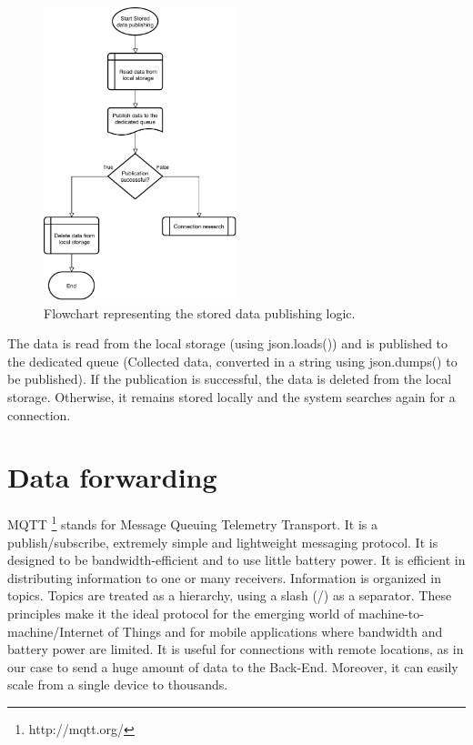 \begin{figure}[h]
\centering 
\includegraphics[width=0.5\textwidth]{images/flowstorage} 
\caption{Flowchart representing the stored data publishing logic.}
\label{fig:flowstorage}
\end{figure}

The data is read from the local storage (using json.loads()) and is published to the dedicated queue (Collected data, converted in a string using json.dumps() to be published). 
If the publication is successful, the data is deleted from the local storage. Otherwise, it remains stored locally and the system searches again for a connection.


\section{Data forwarding}
\label{sec:forward}
\vspace{0.2 cm} 

MQTT \footnote{http://mqtt.org/} stands for Message Queuing Telemetry Transport. It is a publish/subscribe, extremely simple and lightweight messaging protocol. It is designed to be bandwidth-efficient and to use little battery power. It is efficient in distributing information to one or many receivers. Information is organized in topics. Topics are treated as a hierarchy, using a slash (/) as a separator. These principles make it the ideal protocol for the emerging world of machine-to-machine/Internet of Things and for mobile applications where bandwidth and battery power are limited. It is useful for connections with remote locations, as in our case to send a huge amount of data to the Back-End. Moreover, it can easily scale from a single device to thousands.


